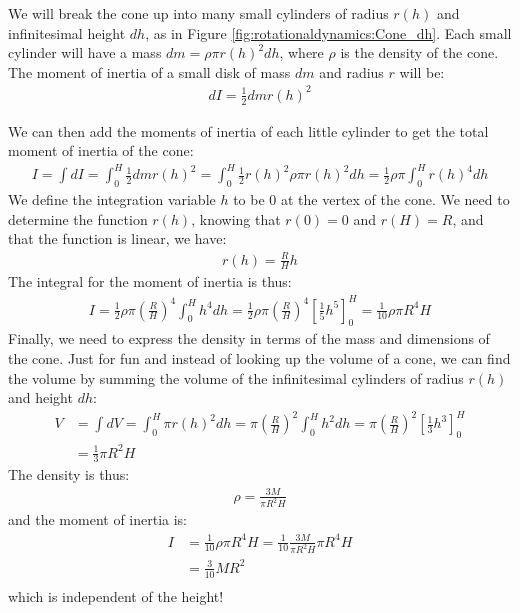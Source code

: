 \begin{solution}
We will break the cone up into many small cylinders of radius $r(h)$ and infinitesimal height $dh$, as in Figure \ref{fig:rotationaldynamics:Cone_dh}. Each small cylinder will have a mass $dm=\rho\pi r(h)^2 dh$, where $\rho$ is the density of the cone. The moment of inertia of a small disk of mass $dm$ and radius $r$ will be:
\begin{align*}
dI=\frac{1}{2}dmr(h)^2
\end{align*} 

We can then add the moments of inertia of each little cylinder to get the total moment of inertia of the cone:
\begin{align*}
I=\int dI=\int_0^H \frac{1}{2} dm r(h)^2=\int_0^H \frac{1}{2}  r(h)^2\rho\pi r(h)^2 dh=\frac{1}{2}  \rho\pi\int_0^H  r(h)^4 dh
\end{align*}
We define the integration variable $h$ to be 0 at the vertex of the cone. We need to determine the function $r(h)$, knowing that $r(0)=0$ and $r(H)=R$, and that the function is linear, we have:
\begin{align*}
r(h) = \frac{R}{H}h
\end{align*}
The integral for the moment of inertia is thus:
\begin{align*}
I=\frac{1}{2} \rho\pi\left(\frac{R}{H}\right)^4\int_0^H  h^4 dh=\frac{1}{2} \rho\pi\left(\frac{R}{H}\right)^4\left[\frac{1}{5}h^5\right]_0^H=\frac{1}{10} \rho\pi R^4H
\end{align*}
Finally, we need to express the density in terms of the mass and dimensions of the cone. Just for fun and instead of looking up the volume of a cone, we can find the volume by summing the volume of the infinitesimal cylinders of radius $r(h)$ and height $dh$:
\begin{align*}
V&=\int dV=\int_0^H  \pi r(h)^2 dh=\pi\left(\frac{R}{H}\right)^2\int_0^H  h^2 dh=\pi\left(\frac{R}{H}\right)^2\left[\frac{1}{3}h^3\right]_0^H\\
&=\frac{1}{3}\pi R^2H
\end{align*}
The density is thus:
\begin{align*}
\rho=\frac{3M}{\pi R^2H}
\end{align*}
and the moment of inertia is:
\begin{align*}
I&=\frac{1}{10} \rho\pi R^4H=\frac{1}{10} \frac{3M}{\pi R^2H}\pi R^4H\\
&=\frac{3}{10}M R^2\\
\end{align*}
which is independent of the height!
\end{solution}


